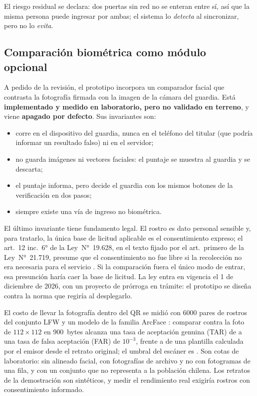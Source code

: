 El riesgo residual se declara: dos puertas sin red no se enteran entre sí, así que la misma persona
puede ingresar por ambas; el sistema lo \emph{detecta} al sincronizar, pero no lo \emph{evita}.

\subsection{Comparación biométrica como módulo opcional}
\label{sec:prototipo-biometria}

A pedido de la revisión, el prototipo incorpora un comparador facial que contrasta la fotografía
firmada con la imagen de la cámara del guardia. Está \textbf{implementado y medido en laboratorio,
pero no validado en terreno}, y viene \textbf{apagado por defecto}. Sus invariantes son:
\begin{itemize}
  \item corre en el dispositivo del guardia, nunca en el teléfono del titular (que podría informar
        un resultado falso) ni en el servidor;
  \item no guarda imágenes ni vectores faciales: el puntaje se muestra al guardia y se descarta;
  \item el puntaje informa, pero decide el guardia con los mismos botones de la verificación en dos
        pasos;
  \item siempre existe una vía de ingreso no biométrica.
\end{itemize}

El último invariante tiene fundamento legal. El rostro es dato personal sensible y, para tratarlo,
la única base de licitud aplicable es el consentimiento expreso; el art.~12 inc.~6° de la
Ley~N°~19.628, en el texto fijado por el art.~primero de la Ley~N°~21.719, presume que el
consentimiento no fue libre si la recolección no era necesaria para el servicio
\cite{PENDIENTE-ley21719}. Si la comparación fuera el único modo de entrar, esa presunción haría
caer la base de licitud. La ley entra en vigencia el 1 de diciembre de 2026, con un proyecto de
prórroga en trámite: el prototipo se diseña contra la norma que regiría al desplegarlo.

El costo de llevar la fotografía dentro del QR se midió con 6000 pares de rostros del conjunto LFW
\cite{PENDIENTE-lfw} y un modelo de la familia ArcFace \cite{PENDIENTE-arcface}: comparar contra la
foto de $112\times112$ en 900~bytes alcanza una tasa de aceptación genuina (TAR) de \TARqr{} a una
tasa de falsa aceptación (FAR) de $10^{-3}$, frente a \TARplantilla{} de una plantilla calculada por
el emisor desde el retrato original; el umbral del escáner es \UmbralBio{}. Son cotas de
laboratorio: sin alineado facial, con fotografías de archivo y no con fotogramas de una fila, y
con un conjunto que no representa a la población chilena. Los retratos de la demostración son
sintéticos, y medir el rendimiento real exigiría rostros con consentimiento informado.


